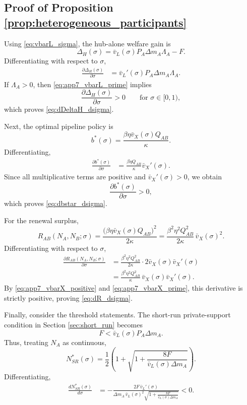 \subsection{Proof of Proposition \ref{prop:heterogeneous_participants}}

Using \eqref{eq:vbarL_sigma}, the hub-alone welfare gain is
\[
\Delta_H(\sigma)
=
\bar v_L(\sigma)P_A\Delta m_A\Lambda_A-F.
\]
Differentiating with respect to $\sigma$,
\begin{align}
\frac{\partial \Delta_H(\sigma)}{\partial \sigma}
&=
\bar v_L'(\sigma)P_A\Delta m_A\Lambda_A.
\label{eq:app7_dDeltaH_dsigma_raw}
\end{align}
If $\Lambda_A>0$, then \eqref{eq:app7_vbarL_prime} implies
\[
\frac{\partial \Delta_H(\sigma)}{\partial \sigma}>0
\qquad
\text{for }\sigma\in[0,1),
\]
which proves \eqref{eq:dDeltaH_dsigma}.

Next, the optimal pipeline policy is
\[
b^*(\sigma)
=
\frac{\beta\eta \bar v_X(\sigma)Q_{AB}}{\kappa}.
\]
Differentiating,
\begin{align}
\frac{\partial b^*(\sigma)}{\partial \sigma}
&=
\frac{\beta\eta Q_{AB}}{\kappa}\bar v_X'(\sigma).
\label{eq:app7_dbstar_dsigma_raw}
\end{align}
Since all multiplicative terms are positive and $\bar v_X'(\sigma)>0$, we obtain
\[
\frac{\partial b^*(\sigma)}{\partial \sigma}>0,
\]
which proves \eqref{eq:dbstar_dsigma}.

For the renewal surplus,
\[
R_{AB}(N_A,N_B;\sigma)
=
\frac{\bigl(\beta\eta \bar v_X(\sigma)Q_{AB}\bigr)^2}{2\kappa}
=
\frac{\beta^2\eta^2Q_{AB}^2}{2\kappa}\,\bar v_X(\sigma)^2.
\]
Differentiating with respect to $\sigma$,
\begin{align}
\frac{\partial R_{AB}(N_A,N_B;\sigma)}{\partial \sigma}
&=
\frac{\beta^2\eta^2Q_{AB}^2}{2\kappa}\cdot 2\bar v_X(\sigma)\bar v_X'(\sigma)
\nonumber\\
&=
\frac{\beta^2\eta^2Q_{AB}^2}{\kappa}\,\bar v_X(\sigma)\bar v_X'(\sigma).
\label{eq:app7_dR_dsigma_raw}
\end{align}
By \eqref{eq:app7_vbarX_positive} and \eqref{eq:app7_vbarX_prime}, this derivative is strictly positive, proving \eqref{eq:dR_dsigma}.

Finally, consider the threshold statements. The short-run private-support condition in Section \ref{sec:short_run} becomes
\[
F<\bar v_L(\sigma)P_A\Delta m_A.
\]
Thus, treating $N_A$ as continuous,
\begin{equation}
N_{SR}^*(\sigma)
=
\frac{1}{2}
\left(
1+\sqrt{1+\frac{8F}{\bar v_L(\sigma)\Delta m_A}}
\right).
\label{eq:app7_NSR_sigma}
\end{equation}
Differentiating,
\begin{align}
\frac{dN_{SR}^*(\sigma)}{d\sigma}
&=
-\frac{2F\,\bar v_L'(\sigma)}
{\Delta m_A\,\bar v_L(\sigma)^2
\sqrt{1+\frac{8F}{\bar v_L(\sigma)\Delta m_A}}}
<0.
\label{eq:app7_dNSR_dsigma}
\end{align}

